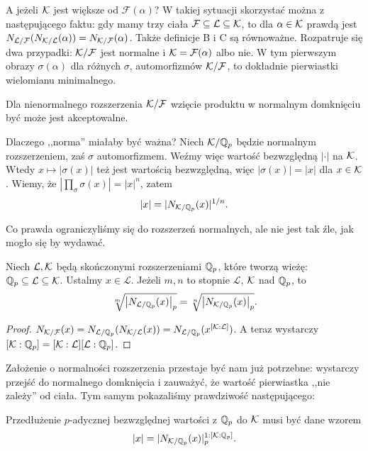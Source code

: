 A jeżeli $\mathcal K$ jest większe od $\mathcal F(\alpha)$?
W takiej sytuacji skorzystać można z następującego faktu: gdy mamy trzy ciała $\mathcal F \subseteq \mathcal L \subseteq \mathcal K$, to dla $\alpha \in \mathcal K$ prawdą jest $N_{\mathcal L / \mathcal F}(N_{\mathcal K / \mathcal L} (\alpha)) = N_{\mathcal K / \mathcal F}(\alpha)$.
Także definicje B i C są równoważne.
Rozpatruje się dwa przypadki: $\mathcal K / \mathcal F$ jest normalne i $\mathcal K = \mathcal F(\alpha)$ albo nie.
W tym pierwszym obrazy $\sigma(\alpha)$ dla różnych $\sigma$, automorfizmów $\mathcal K/ \mathcal F$, to dokładnie pierwiastki wielomianu minimalnego.

Dla nienormalnego rozszerzenia $\mathcal K / \mathcal F$ wzięcie produktu w normalnym domknięciu być może jest akceptowalne. 

Dlaczego ,,norma'' miałaby być ważna?
Niech $\mathcal K / \mathbb Q_p$ będzie normalnym rozszerzeniem, zaś $\sigma$ automorfizmem.
Weźmy więc wartość bezwzględną $|\cdot|$ na $\mathcal K$.
Wtedy $x \mapsto |\sigma(x)|$ też jest wartością bezwzględną, więc $|\sigma(x)| = |x|$ dla $x \in \mathcal K$.
Wiemy, że $|\prod_\sigma \sigma(x)| = |x|^n$, zatem
\[
	|x| = |N_{\mathcal K / \mathbb Q_p}(x)|^{1/n}.
\]

Co prawda ograniczyliśmy się do rozszerzeń normalnych, ale nie jest tak źle, jak mogło się by wydawać.

\begin{lemat}
	Niech $\mathcal L, \mathcal K$ będą skończonymi rozszerzeniami $\mathbb Q_p$, które tworzą wieżę: $\mathbb Q_p \subseteq \mathcal L \subseteq \mathcal K$.
	Ustalmy $x \in \mathcal L$.
	Jeżeli $m, n$ to stopnie $\mathcal L$, $\mathcal K$ nad $\mathbb Q_p$, to
	\[
		\sqrt[m]{\left|N_{\mathcal L / \mathbb Q_p} (x) \right|_p} = \sqrt[n]{\left|N_{\mathcal K / \mathbb Q_p} (x) \right|_p}.
	\]
\end{lemat}

\begin{proof}
	$N_{\mathcal K/\mathcal F}(x) = N_{\mathcal L/\mathbb Q_p} (N_{\mathcal K/\mathcal L}(x)) = N_{\mathcal L/\mathbb Q_p} (x^{[\mathcal K: \mathcal L]})$.
	A teraz wystarczy $[\mathcal K:\mathbb Q_p] = [\mathcal K  :\mathcal L][\mathcal L : \mathbb Q_p]$.
\end{proof}

Założenie o normalności rozszerzenia przestaje być nam już potrzebne: wystarczy przejść do normalnego domknięcia i zauważyć, że wartość pierwiastka ,,nie zależy'' od ciała.
Tym samym pokazaliśmy prawdziwość następującego:

\begin{fakt}
	Przedłużenie $p$-adycznej bezwzględnej wartości z $\mathbb Q_p$ do $\mathcal K$ musi być dane wzorem
	\[
		|x| = |N_{\mathcal K/ \mathbb Q_p}(x)|_p^{1 : [\mathcal K : \mathbb Q_p]}.
	\]
\end{fakt}

